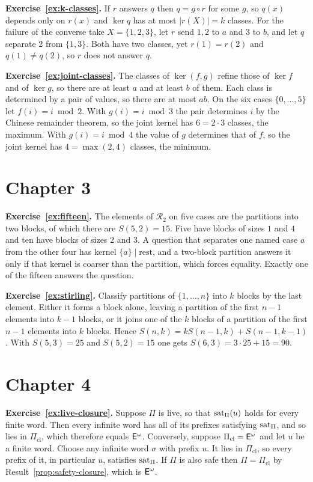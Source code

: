 \textbf{Exercise~\ref{ex:k-classes}.} If $r$ answers $q$ then $q=g\circ r$ for some $g$, so $q(x)$ depends only on $r(x)$ and $\ker q$ has at most $|r(X)|=k$ classes. For the failure of the converse take $X=\{1,2,3\}$, let $r$ send $1,2$ to $a$ and $3$ to $b$, and let $q$ separate $2$ from $\{1,3\}$. Both have two classes, yet $r(1)=r(2)$ and $q(1)\ne q(2)$, so $r$ does not answer $q$.

\textbf{Exercise~\ref{ex:joint-classes}.} The classes of $\ker(f,g)$ refine those of $\ker f$ and of $\ker g$, so there are at least $a$ and at least $b$ of them. Each class is determined by a pair of values, so there are at most $ab$. On the six cases $\{0,\dots,5\}$ let $f(i)=i\bmod2$. With $g(i)=i\bmod3$ the pair determines $i$ by the Chinese remainder theorem, so the joint kernel has $6=2\cdot3$ classes, the maximum. With $g(i)=i\bmod4$ the value of $g$ determines that of $f$, so the joint kernel has $4=\max(2,4)$ classes, the minimum.

\section*{Chapter 3}

\textbf{Exercise~\ref{ex:fifteen}.} The elements of $\mathcal R_2$ on five cases are the partitions into two blocks, of which there are $S(5,2)=15$. Five have blocks of sizes $1$ and $4$ and ten have blocks of sizes $2$ and $3$. A question that separates one named case $a$ from the other four has kernel $\{a\}\mid\text{rest}$, and a two-block partition answers it only if that kernel is coarser than the partition, which forces equality. Exactly one of the fifteen answers the question.

\textbf{Exercise~\ref{ex:stirling}.} Classify partitions of $\{1,\dots,n\}$ into $k$ blocks by the last element. Either it forms a block alone, leaving a partition of the first $n-1$ elements into $k-1$ blocks, or it joins one of the $k$ blocks of a partition of the first $n-1$ elements into $k$ blocks. Hence $S(n,k)=kS(n-1,k)+S(n-1,k-1)$. With $S(5,3)=25$ and $S(5,2)=15$ one gets $S(6,3)=3\cdot25+15=90$.

\section*{Chapter 4}

\textbf{Exercise~\ref{ex:live-closure}.} Suppose $\Pi$ is live, so that $\operatorname{sat}_\Pi(u)$ holds for every finite word. Then every infinite word has all of its prefixes satisfying $\operatorname{sat}_\Pi$, and so lies in $\Pi_{\mathrm{cl}}$, which therefore equals $\mathsf{E}^{\omega}$. Conversely, suppose $\Pi_{\mathrm{cl}}=\mathsf{E}^{\omega}$ and let $u$ be a finite word. Choose any infinite word $\sigma$ with prefix $u$. It lies in $\Pi_{\mathrm{cl}}$, so every prefix of it, in particular $u$, satisfies $\operatorname{sat}_\Pi$. If $\Pi$ is also safe then $\Pi=\Pi_{\mathrm{cl}}$ by Result~\ref{prop:safety-closure}, which is $\mathsf{E}^{\omega}$.

